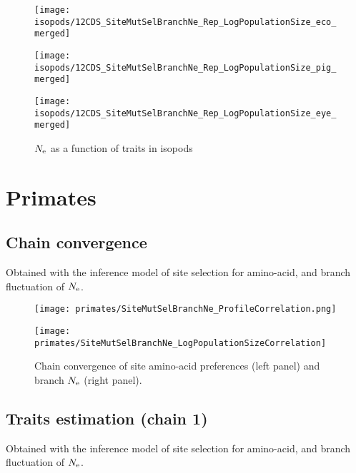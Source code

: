 \begin{figure}[H]
    \centering
    \begin{minipage}{0.32\linewidth}
        \texttt{[image: isopods/12CDS\_SiteMutSelBranchNe\_Rep\_LogPopulationSize\_eco\_merged]}
    \end{minipage}    \hfill
    \begin{minipage}{0.32\linewidth}
        \texttt{[image: isopods/12CDS\_SiteMutSelBranchNe\_Rep\_LogPopulationSize\_pig\_merged]}
    \end{minipage}    \hfill
    \begin{minipage}{0.32\linewidth}
        \texttt{[image: isopods/12CDS\_SiteMutSelBranchNe\_Rep\_LogPopulationSize\_eye\_merged]}
    \end{minipage}
    \caption[$\Ne$ as a function of traits in isopods]{$\Ne$ as a function of traits in isopods}
\end{figure}


\section{Primates}

\subsection{Chain convergence}
Obtained with the inference model of site selection for amino-acid, and branch fluctuation of $\Ne$.

\begin{figure}[H]
    \centering
    \begin{minipage}{0.49\linewidth}
        \texttt{[image: primates/SiteMutSelBranchNe\_ProfileCorrelation.png]}
    \end{minipage}    \hfill
    \begin{minipage}{0.49\linewidth}
        \texttt{[image: primates/SiteMutSelBranchNe\_LogPopulationSizeCorrelation]}
    \end{minipage}
    \caption[Chain convergence of site profiles and branche $\Ne$]{
    Chain convergence of site amino-acid preferences (left panel) and branch $\Ne$ (right panel).}
\end{figure}

\subsection{Traits estimation (chain 1)}
Obtained with the inference model of site selection for amino-acid, and branch fluctuation of $\Ne$.

